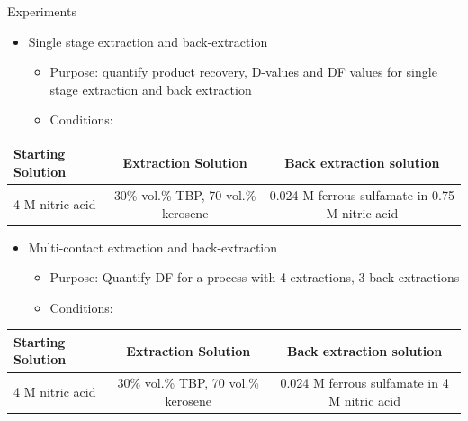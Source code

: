 \documentclass{beamer}
\begin{document}
\begin{frame}{Experiments}
  \begin{itemize}
  \item{Single stage extraction and back-extraction}
    \begin{itemize}
    \item{Purpose: quantify product recovery, D-values and DF values
      for single stage extraction and back extraction}
    \item{Conditions:}
    \end{itemize}
  \end{itemize}
  \begin{center}
    \vskip -0.2cm
    {\fontsize{2.5}{4}\selectfont
      \begin{tabular}{l  c  c}\toprule
        Starting Solution  & Extraction Solution
        & Back extraction solution \\ \midrule \vspace{0.1cm}
        4 M nitric acid & 30\% vol.\% TBP, 70 vol.\% kerosene & 0.024 M ferrous sulfamate in 0.75 M nitric acid \\ \bottomrule
      \end{tabular}
      }
  \end{center}
  \begin{itemize}
  \item{Multi-contact extraction and back-extraction}
    \begin{itemize}
    \item{Purpose: Quantify DF for a process with 4 extractions,
      3 back extractions}
    \item{Conditions:}
    \end{itemize}
  \end{itemize}
    \begin{center}
    \vskip -0.2cm
    {\fontsize{2.5}{4}\selectfont
      \begin{tabular}{l  c  c}\toprule
        Starting Solution  & Extraction Solution
        & Back extraction solution \\ \midrule \vspace{0.1cm}
        4 M nitric acid & 30\% vol.\% TBP, 70 vol.\% kerosene & 0.024 M ferrous sulfamate in 4 M nitric acid \\ \bottomrule
      \end{tabular}
      }
  \end{center}
\end{frame}
\end{document}
